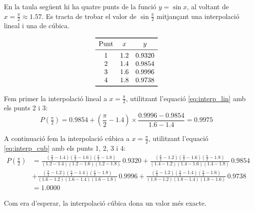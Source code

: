 \begin{exemple}
    En la taula següent hi ha quatre punts de la funció $y = \sin x$, al voltant de $x=\frac{\pi}{2}\approx\num{1,57}$. Es tracta de trobar el valor de $\sin \frac{\pi}{2}$ mitjançant una interpolació lineal i una de cúbica.
    \vspace{-8mm}
    \begin{center}
        \[\begin{array}{ccc}
           \toprule[1pt]
              \text{Punt} & x  & y \\
           \midrule
              1 & \num{1,2} & \num{0,9320} \\
              2 & \num{1,4} & \num{0,9854} \\
              3 & \num{1,6} & \num{0,9996} \\
              4 & \num{1,8} & \num{0,9738} \\
           \bottomrule[1pt]
        \end{array} \]
    \end{center}

    Fem primer la interpolació lineal a $x= \frac{\pi}{2}$, utilitzant l'equació \eqref{eq:interp_lin} amb els punts 2 i 3:
    \[ P\left(\tfrac{\pi}{2}\right) = \num{0,9854}+\left(\frac{\pi}{2}-\num{1,4}\right)\times\frac{\num{0,9996}-\num{0,9854}}{\num{1,6}-\num{1,4}}=
    \num{0,9975} \]

    A continuació fem la interpolació cúbica a $x= \frac{\pi}{2}$, utilitzant l'equació \eqref{eq:interp_cub} amb els punts 1, 2, 3 i 4:
    \[\begin{split}
      P\left(\tfrac{\pi}{2}\right) &= \frac{(\tfrac{\pi}{2}-\num{1,4})(\tfrac{\pi}{2}-\num{1,6})(\tfrac{\pi}{2}-\num{1,8})}{(\num{1,2}-\num{1,4})(\num{1,2}-\num{1,6})(\num{1,2}-\num{1,8})}\, \num{0,9320} +
              \frac{(\tfrac{\pi}{2}-\num{1,2})(\tfrac{\pi}{2}-\num{1,6})(\tfrac{\pi}{2}-\num{1,8})}{(\num{1,4}-\num{1,2})(\num{1,4}-\num{1,6})(\num{1,4}-\num{1,8})}\, \num{0,9854}  \\[1.5ex]
           &+ \frac{(\tfrac{\pi}{2}-\num{1,2})(\tfrac{\pi}{2}-\num{1,4})(\tfrac{\pi}{2}-\num{1,8})}{(\num{1,6}-\num{1,2})(\num{1,6}-\num{1,4})(\num{1,6}-\num{1,8})}\, \num{0,9996}+
              \frac{(\tfrac{\pi}{2}-\num{1,2})(\tfrac{\pi}{2}-\num{1,4})(\tfrac{\pi}{2}-\num{1,6})}{(\num{1,8}-\num{1,2})(\num{1,8}-\num{1,4})(\num{1,8}-\num{1,6})}\, \num{0,9738}  \\[1.5ex]
           &= \num{1,0000}
    \end{split}\]


    Com era d'esperar, la interpolació cúbica dona un valor més exacte.
\end{exemple}

